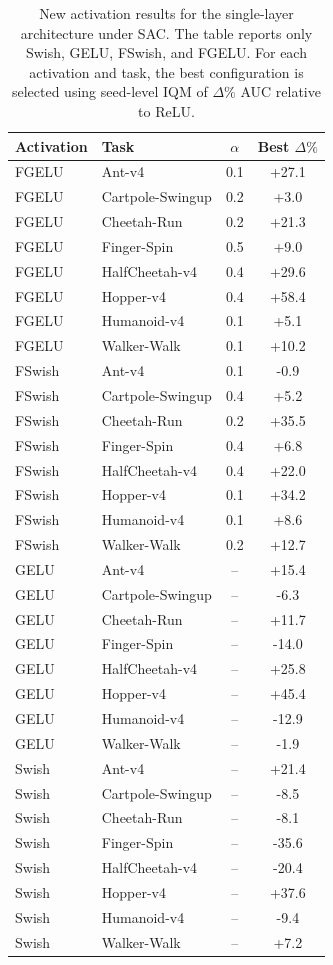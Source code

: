 \begin{table}[t]
\centering
\small
\setlength{\tabcolsep}{4pt}
\renewcommand{\arraystretch}{1.12}
\caption{New activation results for the single-layer architecture under SAC. The table reports only Swish, GELU, FSwish, and FGELU. For each activation and task, the best configuration is selected using seed-level IQM of $\Delta\%$ AUC relative to ReLU.}
\label{tab:new-results-sac-1layer}
\begin{tabular}{llcc}
\toprule
Activation & Task & $\alpha$ & Best $\Delta\%$ \\
\midrule
FGELU & Ant-v4 & 0.1 & +27.1 \\
FGELU & Cartpole-Swingup & 0.2 & +3.0 \\
FGELU & Cheetah-Run & 0.2 & +21.3 \\
FGELU & Finger-Spin & 0.5 & +9.0 \\
FGELU & HalfCheetah-v4 & 0.4 & +29.6 \\
FGELU & Hopper-v4 & 0.4 & +58.4 \\
FGELU & Humanoid-v4 & 0.1 & +5.1 \\
FGELU & Walker-Walk & 0.1 & +10.2 \\
FSwish & Ant-v4 & 0.1 & -0.9 \\
FSwish & Cartpole-Swingup & 0.4 & +5.2 \\
FSwish & Cheetah-Run & 0.2 & +35.5 \\
FSwish & Finger-Spin & 0.4 & +6.8 \\
FSwish & HalfCheetah-v4 & 0.4 & +22.0 \\
FSwish & Hopper-v4 & 0.1 & +34.2 \\
FSwish & Humanoid-v4 & 0.1 & +8.6 \\
FSwish & Walker-Walk & 0.2 & +12.7 \\
GELU & Ant-v4 & -- & +15.4 \\
GELU & Cartpole-Swingup & -- & -6.3 \\
GELU & Cheetah-Run & -- & +11.7 \\
GELU & Finger-Spin & -- & -14.0 \\
GELU & HalfCheetah-v4 & -- & +25.8 \\
GELU & Hopper-v4 & -- & +45.4 \\
GELU & Humanoid-v4 & -- & -12.9 \\
GELU & Walker-Walk & -- & -1.9 \\
Swish & Ant-v4 & -- & +21.4 \\
Swish & Cartpole-Swingup & -- & -8.5 \\
Swish & Cheetah-Run & -- & -8.1 \\
Swish & Finger-Spin & -- & -35.6 \\
Swish & HalfCheetah-v4 & -- & -20.4 \\
Swish & Hopper-v4 & -- & +37.6 \\
Swish & Humanoid-v4 & -- & -9.4 \\
Swish & Walker-Walk & -- & +7.2 \\
\bottomrule
\end{tabular}
\end{table}
